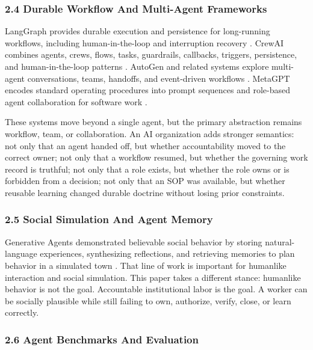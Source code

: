 \documentclass[
]{article}
\begin{document}
\subsubsection{2.4 Durable Workflow And Multi-Agent Frameworks}\label{durable-workflow-and-multi-agent-frameworks}

LangGraph provides durable execution and persistence for long-running workflows, including human-in-the-loop and interruption recovery \citep{langchain2026langgraphDurableExecution}. CrewAI combines agents, crews, flows, tasks, guardrails, callbacks, triggers, persistence, and human-in-the-loop patterns \citep{crewai2026documentation}. AutoGen and related systems explore multi-agent conversations, teams, handoffs, and event-driven workflows \citep{wu2023autogen}. MetaGPT encodes standard operating procedures into prompt sequences and role-based agent collaboration for software work \citep{hong2023metagpt}.

These systems move beyond a single agent, but the primary abstraction remains workflow, team, or collaboration. An AI organization adds stronger semantics: not only that an agent handed off, but whether accountability moved to the correct owner; not only that a workflow resumed, but whether the governing work record is truthful; not only that a role exists, but whether the role owns or is forbidden from a decision; not only that an SOP was available, but whether reusable learning changed durable doctrine without losing prior constraints.

\subsubsection{2.5 Social Simulation And Agent Memory}\label{social-simulation-and-agent-memory}

Generative Agents demonstrated believable social behavior by storing natural-language experiences, synthesizing reflections, and retrieving memories to plan behavior in a simulated town \citep{park2023generativeAgents}. That line of work is important for humanlike interaction and social simulation. This paper takes a different stance: humanlike behavior is not the goal. Accountable institutional labor is the goal. A worker can be socially plausible while still failing to own, authorize, verify, close, or learn correctly.

\subsubsection{2.6 Agent Benchmarks And Evaluation}\label{agent-benchmarks-and-evaluation}
\end{document}
